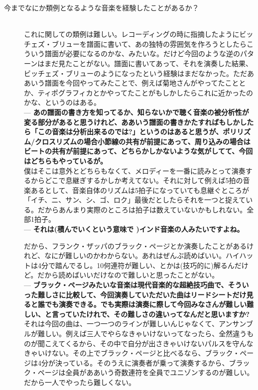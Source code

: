 \documentclass[uplatex,dvipdfmx]{ujarticle}
\begin{document}
\begin{description}
\item [今までなにか類例となるような音楽を経験したことがあるか？]\mbox{}\\

これに関しての類例は難しい。レコーディングの時に指摘したようにビッチェズ・ブリューを譜面に書いて、あの独特の雰囲気を作ろうとしたらこういう譜面が必要になるのかな、みたいな。だけど今回のような逆のパターンはまだ見たことがない。譜面に書いてあって、それを演奏した結果、ビッチェズ・ブリューのようになったという経験はまだなかった。ただああいう譜面を今回やってみたことで、例えば菊地さんがやってたこととか、ティポグラフィカとかやってたことがもしかしたらこれに近かったのかな、というのはある。\\

--- {\bf あの譜面の書き方を知ってるか、知らないかで聴く音楽の被分析性が変る部分があると思うけれど、ああいう譜面の書きかたすればもしかしたら「この音楽は分析出来るのでは?」というのはあると思うが、ポリリズム/クロスリズムの場合小節線の共有が前提にあって、周り込みの場合はビートの共有が前提にあって、どちらかしかないような気がしてて、今回はどちらもやっているが。}\\

僕はそこは意外とどちらもなくて、メロディーを一番に読みとって演奏するからどこで息継ぎするかしか考えてない。それに対して例えば5拍の音楽あるとして、音楽自体のリズムは5拍子になっていても息継ぐところが「イチ、ニ、サン、シ、ゴ、ロク」最後だとしたらそれを一つと捉えている。だからあんまり実際のところは拍子は数えていないかもしれない。全部1拍子。\\

--- {\bf それは(積んでいくという意味で  )インド音楽の人みたいですよね。}

だから、フランク・ザッパのブラック・ページとか演奏したことがあるけれど、なにが難しいのかわからない。あれはぜんぶ読めばいい。ハイハットは4分で踏んでるし。10何連符が難しい、とかは(技巧的に)解るんだけど。だから読めばいいだけなので難しいと思ったことがない。\\

--- {\bf ブラック・ページみたいな音楽は現代音楽的な超絶技巧曲で、そういった難しさに比較して、今回演奏していただいた曲はリードシートだけ見ると誰でも演奏できる。でも実際は演奏に際して今回みなさんが難しい難しい、と言っていたけれで、その難しさの違いってなんだと思いますか?}\\

それは今回の曲は、一つ一つのラインが難しいんじゃなくて、アンサンブルが難しい。例えば三人でやらなきゃいけないってなったら、全然違うものが聞こえてくるから、その中で自分が出さきゃいけないパルスを守んなきゃいけない。その上でブラック・ページと比べるなら、ブラック・ページは4分が決っている。そのうえに演奏者が乗って演奏するから、ブラック・ページは全員がああいう奇数連符を全員でユニゾンするのが難しい。だから一人でやったら難しくない。\\


\end{description}
\end{document}
